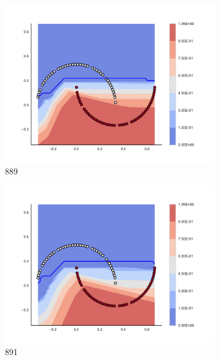 \begin{figure}[h]
\begin{subfigure}[b]{0.09\textwidth}
    \includegraphics[clip, trim=2.35cm 1.75cm 4.5cm 0cm,width=\textwidth]{img/convergence/889.pdf}
    \caption{889}
    \label{fig:convergence_889}
\end{subfigure}
%
\begin{subfigure}[b]{0.09\textwidth}
    \includegraphics[clip, trim=2.35cm 1.75cm 4.5cm 0cm,width=\textwidth]{img/convergence/891.pdf}
    \caption{891}
    \label{fig:convergence_891}
\end{subfigure}
%
\begin{subfigure}[b]{0.09\textwidth}

\end{subfigure}
\end{figure}
